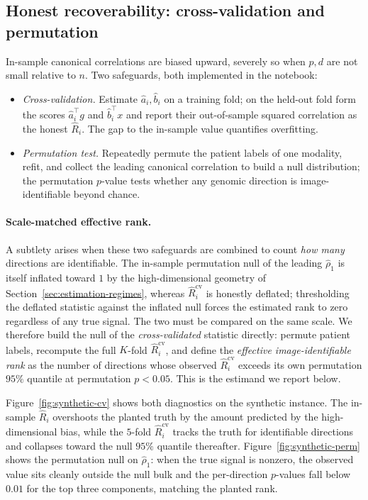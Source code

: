 \documentclass{article}
\newcommand{\T}{^{\top}}
\begin{document}
\subsection{Honest recoverability: cross-validation and permutation}
\label{sec:estimation-honest}
In-sample canonical correlations are biased upward, severely so when $p, d$ are
not small relative to $n$. Two safeguards, both implemented in the notebook:
\begin{itemize}
\item \emph{Cross-validation.} Estimate $\hat a_i, \hat b_i$ on a training fold;
on the held-out fold form the scores $\hat a_i\T g$ and $\hat b_i\T x$ and report
their out-of-sample squared correlation as the honest $\hat R_i$. The gap to the
in-sample value quantifies overfitting.
\item \emph{Permutation test.} Repeatedly permute the patient labels of one
modality, refit, and collect the leading canonical correlation to build a null
distribution; the permutation $p$-value tests whether any genomic direction is
image-identifiable beyond chance.
\end{itemize}

\paragraph{Scale-matched effective rank.}
A subtlety arises when these two safeguards are combined to count
\emph{how many} directions are identifiable. The in-sample permutation null
of the leading $\hat\rho_1$ is itself inflated toward $1$ by the
high-dimensional geometry of Section~\ref{sec:estimation-regimes}, whereas
$\hat R_i^{\mathrm{cv}}$ is honestly deflated; thresholding the deflated
statistic against the inflated null forces the estimated rank to zero
regardless of any true signal. The two must be compared on the same scale. We
therefore build the null of the \emph{cross-validated} statistic directly:
permute patient labels, recompute the full $K$-fold $\hat R_i^{\mathrm{cv}}$,
and define the \emph{effective image-identifiable rank} as the number of
directions whose observed $\hat R_i^{\mathrm{cv}}$ exceeds its own
permutation $95\%$ quantile at permutation $p<0.05$. This is the estimand we
report below.

Figure~\ref{fig:synthetic-cv} shows both diagnostics on the synthetic instance.
The in-sample $\hat R_i$ overshoots the planted truth by the amount predicted
by the high-dimensional bias, while the $5$-fold $\hat R_i^{\mathrm{cv}}$
tracks the truth for identifiable directions and collapses toward the null
$95\%$ quantile thereafter. Figure~\ref{fig:synthetic-perm} shows the
permutation null on $\hat\rho_1$: when the true signal is nonzero, the
observed value sits cleanly outside the null bulk and the per-direction
$p$-values fall below $0.01$ for the top three components, matching the
planted rank.
\end{document}
